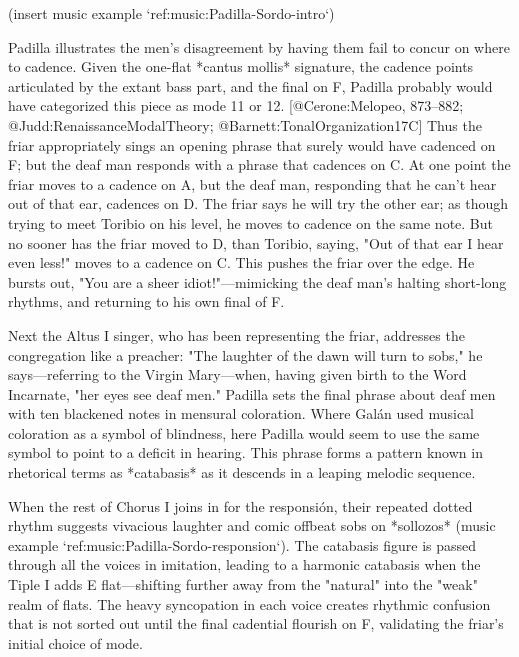 (insert music example `ref:music:Padilla-Sordo-intro`)
\label{music:Padilla-Sordo-intro}

Padilla illustrates the men's disagreement by having them fail to concur on
where to cadence. 
Given the one-flat *cantus mollis* signature, the cadence points articulated by
the extant bass part, and the final on F, Padilla probably would have
categorized this piece as mode 11 or 12.
[@Cerone:Melopeo, 873--882; @Judd:RenaissanceModalTheory;
@Barnett:TonalOrganization17C] 
Thus the friar appropriately sings an opening phrase that surely would have
cadenced on F; but the deaf man responds with a phrase that cadences on C.
At one point the friar moves to a cadence on A, but the deaf man, responding
that he can't hear out of that ear, cadences on D. The friar says he will try
the other ear; as though trying to meet Toribio on his level, he moves to
cadence on the same note.
But no sooner has the friar moved to D, than Toribio, saying,
"Out of that ear I hear even less!" moves to a cadence on C. 
This pushes the friar over the edge.
He bursts out, "You are a sheer idiot!"---mimicking the deaf man's halting
short-long rhythms, and returning to his own final of F. 

Next the Altus I singer, who has been representing the friar, addresses the
congregation like a preacher: "The laughter of the dawn will turn to sobs," he
says---referring to the Virgin Mary---when, having given birth to the Word
Incarnate, "her eyes see deaf men." 
Padilla sets the final phrase about deaf men with ten blackened notes in mensural
coloration.
Where Galán used musical coloration as a symbol of blindness, here Padilla would
seem to use the same symbol to point to a deficit in hearing.
This phrase forms a pattern known in rhetorical terms as *catabasis* as it
descends in a leaping melodic sequence.

When the rest of Chorus I joins in for the responsión, their repeated dotted
rhythm suggests vivacious laughter and comic offbeat sobs on *sollozos*
(music example `ref:music:Padilla-Sordo-responsion`). 
The catabasis figure is passed through all the voices in imitation, leading to a
harmonic catabasis when the Tiple I adds E flat---shifting further away from the
"natural" into the "weak" realm of flats. 
The heavy syncopation in each voice creates rhythmic confusion that is not
sorted out until the final cadential flourish on F, validating the friar's
initial choice of mode. 

